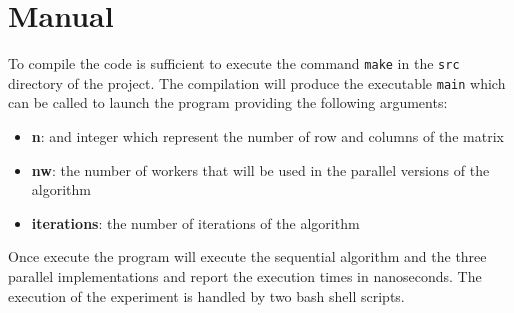 \documentclass{article}
\begin{document}
	\section{Manual}
	To compile the code is sufficient to execute the command \verb*|make| in the \verb*|src| directory of the project. The compilation will produce the executable \verb*|main| which can be called to launch the program providing the following arguments:
	\begin{itemize}
		\item \textbf{n}: and integer which represent the number of row and columns of the matrix
		\item \textbf{nw}: the number of workers that will be used in the parallel versions of the algorithm
		\item \textbf{iterations}: the number of iterations of the algorithm
	\end{itemize} 
	Once execute the program will execute the sequential algorithm and the three parallel implementations and report the execution times in nanoseconds. The execution of the experiment is handled by two bash shell scripts.
\end{document}
